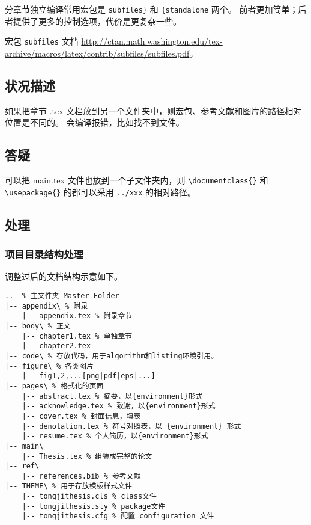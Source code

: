 \documentclass[../Main/thesis.tex]{subfiles}
\begin{document}
分章节独立编译常用宏包是 \texttt{subfiles\}} 和 \texttt{\{standalone} 两个。
前者更加简单；后者提供了更多的控制选项，代价是更复杂一些。

宏包 \texttt{subfiles} 文档
\url{http://ctan.math.washington.edu/tex-archive/macros/latex/contrib/subfiles/subfiles.pdf}。

\subsection{状况描述}

如果把章节 .tex 文档放到另一个文件夹中，则宏包、参考文献和图片的路径相对位置是不同的。
会编译报错，比如找不到文件。

\subsection{答疑}

可以把 main.tex 文件也放到一个子文件夹内，则 \texttt{\textbackslash{}documentclass\{\}} 和 \texttt{\textbackslash{}usepackage\{\}} 的都可以采用 \texttt{../xxx} 的相对路径。

\subsection{处理}

\subsubsection{项目目录结构处理}

调整过后的文档结构示意如下。

\begin{verbatim}
..  % 主文件夹 Master Folder
|-- appendix\ % 附录
    |-- appendix.tex % 附录章节
|-- body\ % 正文
    |-- chapter1.tex % 单独章节
    |-- chapter2.tex
|-- code\ % 存放代码，用于algorithm和listing环境引用。
|-- figure\ % 各类图片
    |-- fig1,2,...[png|pdf|eps|...]
|-- pages\ % 格式化的页面
    |-- abstract.tex % 摘要，以{environment}形式
    |-- acknowledge.tex % 致谢，以{environment}形式
    |-- cover.tex % 封面信息，填表
    |-- denotation.tex % 符号对照表，以 {environment} 形式
    |-- resume.tex % 个人简历，以{environment}形式
|-- main\
    |-- Thesis.tex % 组装成完整的论文
|-- ref\
    |-- references.bib % 参考文献
|-- THEME\ % 用于存放模板样式文件
    |-- tongjithesis.cls % class文件
    |-- tongjithesis.sty % package文件
    |-- tongjithesis.cfg % 配置 configuration 文件
\end{verbatim}
\end{document}
